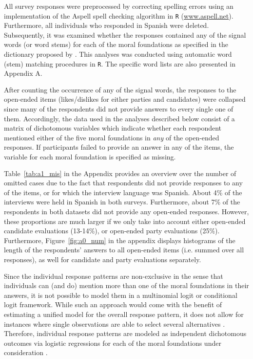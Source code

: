 \documentclass[12pt]{article}
\begin{document}
All survey responses were preprocessed by correcting spelling errors using an implementation of the Aspell spell checking algorithm in \texttt{R} (\url{www.aspell.net}). Furthermore, all individuals who responded in Spanish were deleted. Subsequently, it was examined whether the responses contained any of the signal words (or word stems) for each of the moral foundations as specified in the dictionary proposed by \citet{graham2009liberals}. This analyses was conducted using automatic word (stem) matching procedures in \texttt{R}. The specific word lists are also presented in Appendix A. 

After counting the occurrence of any of the signal words, the responses to the open-ended items (likes/dislikes for either parties and candidates) were collapsed since many of the respondents did not provide answers to every single one of them. Accordingly, the data used in the analyses described below consist of a matrix of dichotomous variables which indicate whether each respondent mentioned either of the five moral foundations in \textit{any} of the open-ended responses. If participants failed to provide an answer in any of the items, the variable for each moral foundation is specified as missing.

Table~\ref{tab:a1_mis} in the Appendix provides an overview over the number of omitted cases due to the fact that respondents did not provide responses to any of the items, or for which the interview language was Spanish. About 4\% of the interviews were held in Spanish in both surveys. Furthermore, about 7\% of the respondents in both datasets did not provide any open-ended responses. However, these proportions are much larger if we only take into account either open-ended candidate evaluations (13-14\%), or open-ended party evaluations (25\%). Furthermore, Figure~\ref{fig:a0_num} in the appendix displays histograms of the length of the respondents' answers to all open-ended items (i.e. summed over all responses), as well for candidate and party evaluations separately.

Since the individual response patterns are non-exclusive in the sense that individuals can (and do) mention more than one of the moral foundations in their answers, it is not possible to model them in a multinomial logit or conditional logit framework. While such an approach would come with the benefit of estimating a unified model for the overall response pattern, it does not allow for instances where single observations are able to select several alternatives \citep[but see][]{gilbert2007models}. Therefore, individual response patterns are modeled as independent dichotomous outcomes via logistic regressions for each of the moral foundations under consideration \citep[c.f. for example][]{agresti1999modeling}.
\end{document}
